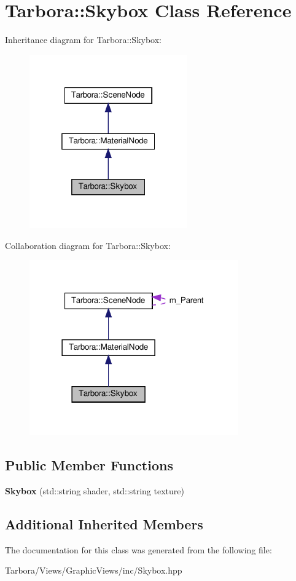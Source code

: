 \hypertarget{classTarbora_1_1Skybox}{}\section{Tarbora\+:\+:Skybox Class Reference}
\label{classTarbora_1_1Skybox}


Inheritance diagram for Tarbora\+:\+:Skybox\+:
\nopagebreak
\begin{figure}[H]
\begin{center}
\leavevmode
\includegraphics[width=193pt]{classTarbora_1_1Skybox__inherit__graph}
\end{center}
\end{figure}


Collaboration diagram for Tarbora\+:\+:Skybox\+:
\nopagebreak
\begin{figure}[H]
\begin{center}
\leavevmode
\includegraphics[width=254pt]{classTarbora_1_1Skybox__coll__graph}
\end{center}
\end{figure}
\subsection*{Public Member Functions}
\begin{DoxyCompactItemize}
\item 
\mbox{\label{classTarbora_1_1Skybox_a93e9ec59a3bba43da5b859b0b6b82f9f}} 
{\bfseries Skybox} (std\+::string shader, std\+::string texture)
\end{DoxyCompactItemize}
\subsection*{Additional Inherited Members}


The documentation for this class was generated from the following file\+:\begin{DoxyCompactItemize}
\item 
Tarbora/\+Views/\+Graphic\+Views/inc/Skybox.\+hpp\end{DoxyCompactItemize}
